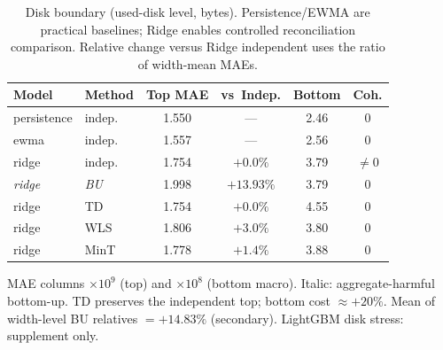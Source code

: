 \begin{table}[width=\columnwidth,pos=!t]
\centering
\caption{Disk boundary (used-disk level, bytes). Persistence/{EWMA} are
practical baselines; Ridge enables controlled reconciliation comparison.
Relative change versus Ridge independent uses the ratio of width-mean MAEs.}
\label{tab:disk_boundary}
\begin{threeparttable}
\small
\setlength{\tabcolsep}{2.5pt}
\begin{tabular*}{\tblwidth}{@{\extracolsep{\fill}}llcccc@{}}
\toprule
Model & Method & Top MAE & vs~Indep. & Bottom & Coh. \\
\midrule
persistence & indep. & 1.550 & --- & 2.46 & 0 \\
ewma & indep. & 1.557 & --- & 2.56 & 0 \\
ridge & indep. & 1.754 & $+0.0\%$ & 3.79 & $\neq0$ \\
\textit{ridge} & \textit{BU} & 1.998 & $+13.93\%$ & 3.79 & 0 \\
ridge & TD & 1.754 & $+0.0\%$ & 4.55 & 0 \\
ridge & WLS & 1.806 & $+3.0\%$ & 3.80 & 0 \\
ridge & MinT & 1.778 & $+1.4\%$ & 3.88 & 0 \\
\bottomrule
\end{tabular*}
\begin{tablenotes}
\footnotesize
\item MAE columns $\times 10^9$ (top) and $\times 10^8$ (bottom macro).
Italic: aggregate-harmful bottom-up. TD preserves the independent top;
bottom cost $\approx +20\%$. Mean of width-level BU relatives $=+14.83\%$
(secondary). LightGBM disk stress: supplement only.
\end{tablenotes}
\end{threeparttable}
\end{table}
